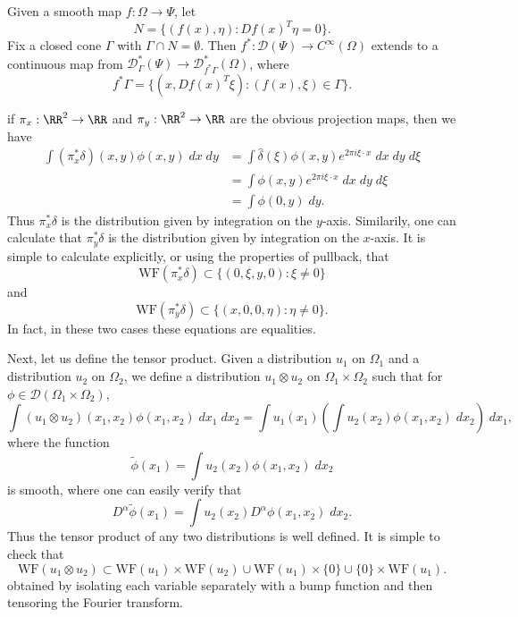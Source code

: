 \begin{theorem}
    Given a smooth map $f: \Omega \to \Psi$, let
    \[ N = \{ (f(x),\eta): Df(x)^T \eta = 0 \}. \]
    Fix a closed cone $\Gamma$ with $\Gamma \cap N = \emptyset$. Then $f^*: \mathcal{D}(\Psi) \to C^\infty(\Omega)$ extends to a continuous map from $\mathcal{D}^*_\Gamma(\Psi) \to \mathcal{D}^*_{f^* \Gamma}(\Omega)$, where
    \[ f^* \Gamma = \{ (x,Df(x)^T \xi) : (f(x), \xi) \in \Gamma \}. \]
\end{theorem}

\begin{example}
    if $\pi_x: \RR^2 \to \RR$ and $\pi_y: \RR^2 \to \RR$ are the obvious projection maps, then we have
    \begin{align*}
        \int (\pi_x^* \delta)(x,y) \phi(x,y)\; dx\; dy &= \int \widehat{\delta}(\xi) \phi(x,y) e^{2 \pi i \xi \cdot x}\; dx\; dy\; d\xi\\
        &= \int \phi(x,y) e^{2 \pi i \xi \cdot x}\; dx\; dy\; d\xi\\
        &= \int \phi(0,y)\; dy.
    \end{align*}
    Thus $\pi_x^* \delta$ is the distribution given by integration on the $y$-axis. Similarily, one can calculate that $\pi_y^* \delta$ is the distribution given by integration on the $x$-axis. It is simple to calculate explicitly, or using the properties of pullback, that
    \[ \text{WF}(\pi_x^* \delta) \subset \{ (0,\xi,y,0) : \xi \neq 0 \} \]
    and
    \[ \text{WF}(\pi_y^* \delta) \subset \{ (x,0,0,\eta): \eta \neq 0 \}. \]
    In fact, in these two cases these equations are equalities.
\end{example}

Next, let us define the tensor product. Given a distribution $u_1$ on $\Omega_1$ and a distribution $u_2$ on $\Omega_2$, we define a distribution $u_1 \otimes u_2$ on $\Omega_1 \times \Omega_2$ such that for $\phi \in \mathcal{D}(\Omega_1 \times \Omega_2)$,
%
\[ \int (u_1 \otimes u_2)(x_1,x_2) \phi(x_1,x_2)\; dx_1\; dx_2 = \int u_1(x_1) \left( \int u_2(x_2) \phi(x_1,x_2)\; dx_2 \right)\; dx_1, \]
%
where the function
%
\[ \tilde{\phi}(x_1) = \int u_2(x_2) \phi(x_1,x_2)\; dx_2 \]
%
is smooth, where one can easily verify that
%
\[ D^\alpha \tilde{\phi}(x_1) = \int u_2(x_2) D^\alpha \phi(x_1,x_2)\; dx_2. \]
%
Thus the tensor product of any two distributions is well defined. It is simple to check that
%
\[ \text{WF}(u_1 \otimes u_2) \subset \text{WF}(u_1) \times \text{WF}(u_2) \cup \text{WF}(u_1) \times \{ 0 \} \cup \{ 0 \} \times \text{WF}(u_1). \]
%
obtained by isolating each variable separately with a bump function and then tensoring the Fourier transform.

